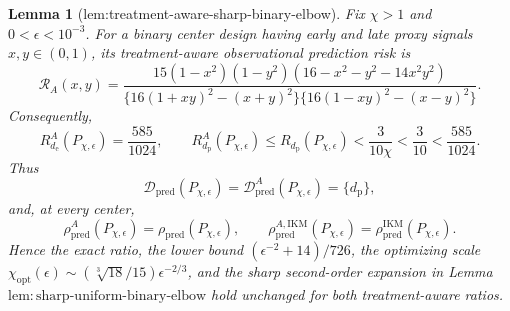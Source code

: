 \documentclass{article}
\newtheorem{lemma}{Lemma}
\begin{document}
\begin{lemma}[lem:treatment-aware-sharp-binary-elbow]\label{lem:treatment-aware-sharp-binary-elbow}
Fix \(\chi>1\) and \(0<\epsilon<10^{-3}\). For a binary center design having early and late proxy signals \(x,y\in(0,1)\), its treatment-aware observational prediction risk is
\[
 \mathcal R_A(x,y)=
 \frac{15(1-x^2)(1-y^2)(16-x^2-y^2-14x^2y^2)}
 {\{16(1+xy)^2-(x+y)^2\}\{16(1-xy)^2-(x-y)^2\}}. \tag{1}
\]
Consequently,
\[
 R_{d_{\mathrm e}}^A(P_{\chi,\epsilon})=\frac{585}{1024},
 \qquad
 R_{d_{\mathrm p}}^A(P_{\chi,\epsilon})
 \le R_{d_{\mathrm p}}(P_{\chi,\epsilon})
 <\frac{3}{10\chi}<\frac3{10}<\frac{585}{1024}. \tag{2}
\]
Thus
\[
 \mathcal D_{\mathrm{pred}}(P_{\chi,\epsilon})
 =\mathcal D_{\mathrm{pred}}^A(P_{\chi,\epsilon})
 =\{d_{\mathrm p}\},
\]
and, at every center,
\[
 \rho_{\mathrm{pred}}^A(P_{\chi,\epsilon})
 =\rho_{\mathrm{pred}}(P_{\chi,\epsilon}),
 \qquad
 \rho_{\mathrm{pred}}^{A,\mathrm{IKM}}(P_{\chi,\epsilon})
 =\rho_{\mathrm{pred}}^{\mathrm{IKM}}(P_{\chi,\epsilon}). \tag{3}
\]
Hence the exact ratio, the lower bound \((\epsilon^{-2}+14)/726\), the optimizing scale \(\chi_{\mathrm{opt}}(\epsilon)\sim(\sqrt[3]{18}/15)\epsilon^{-2/3}\), and the sharp second-order expansion in Lemma~\(\mathrm{lem{:}sharp\text{-}uniform\text{-}binary\text{-}elbow}\) hold unchanged for both treatment-aware ratios.
\end{lemma}
\end{document}
